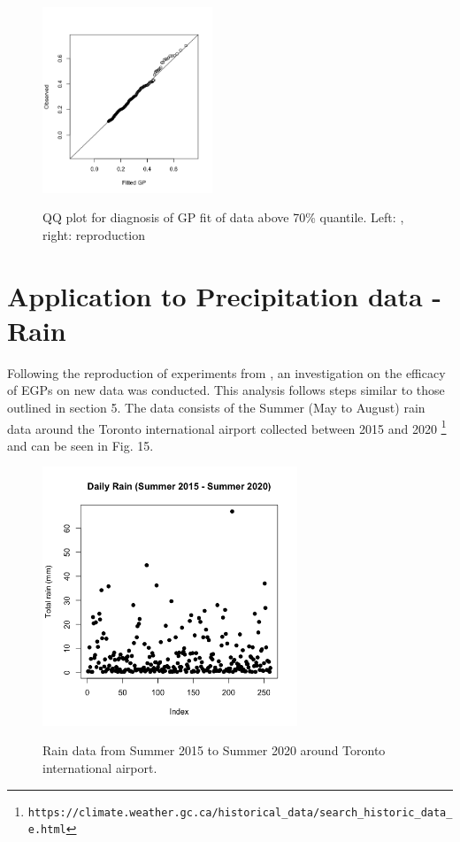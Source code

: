\documentclass[12pt]{article}
\theoremstyle{definition}
\theoremstyle{definition}
\begin{document}
\begin{figure}[H]
\begin{center}
{\includegraphics[width=2.0in]{project/papafiles/fig8.me.gp.png}}
\caption{QQ plot for diagnosis of GP fit of data above 70\% quantile. Left: \cite{papatawn}, right: reproduction }
\end{center}
\end{figure}

\section{Application to Precipitation data - Rain}
Following the reproduction of experiments from \cite{papatawn}, an investigation on the efficacy of EGPs on new data was conducted. This analysis follows steps similar to those outlined in section 5. The data consists of the Summer (May to August) rain data around the Toronto international airport collected between 2015 and 2020 \footnote{ \texttt{https://climate.weather.gc.ca/historical\_data/search\_historic\_data\_e.html}} and can be seen in Fig. 15.

\begin{figure}[H]
\begin{center}
{\includegraphics[width=3.0in]{project/papafiles/rain.png}}
\caption{Rain data from Summer 2015 to Summer 2020 around Toronto international airport.}
\end{center}
\end{figure}
\end{document}
